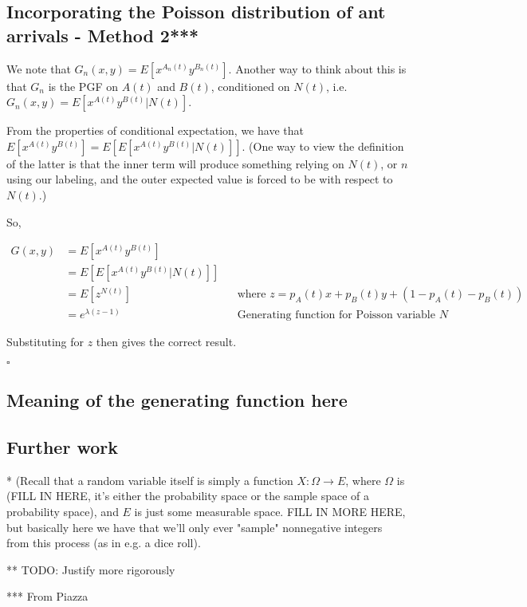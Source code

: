 \documentclass{article}
\begin{document}
\subsection{Incorporating the Poisson distribution of ant arrivals - Method 2***}

We note that $G_n(x,y) = E[x^{A_n(t)} y^{B_n(t)}]$. Another way to think about this is that $G_n$ is the PGF on $A(t)$ and $B(t)$, conditioned on $N(t)$, i.e. $G_n(x,y) = E[x^{A(t)} y^{B(t)} | N(t)]$. 

From the properties of conditional expectation, we have that $E[x^{A(t)} y^{B(t)}] = E[E[x^{A(t)} y^{B(t)} | N(t)]]$. (One way to view the definition of the latter is that the inner term will produce something relying on $N(t)$, or $n$ using our labeling, and the outer expected value is forced to be with respect to $N(t)$.)

So,

\begin{align*}
G(x,y) &= E[x^{A(t)} y^{B(t)}] \\
&= E[E[x^{A(t)} y^{B(t)} | N(t)]] \\
&= E[z^{N(t)}] && \text{where $z = p_A(t) x + p_B(t) y + (1 - p_A(t) - p_B(t))$}\\
&= e^{\lambda (z-1)} && \text{Generating function for Poisson variable $N$}
\end{align*}

Substituting for $z$ then gives the correct result.



$\square$


\subsection{Meaning of the generating function here}


\subsection{Further work}






* (Recall that a random variable itself is simply a function $X: \Omega \rightarrow E$, where $\Omega$ is (FILL IN HERE, it's either the probability space or the sample space of a probability space), and $E$ is just some measurable space. FILL IN MORE HERE, but basically here we have that we'll only ever "sample" nonnegative integers from this process (as in e.g. a dice roll). 

** TODO: Justify more rigorously

*** From Piazza
\end{document}
